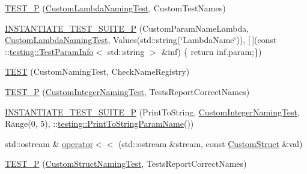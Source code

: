 \begin{DoxyCompactItemize}
\item 
\mbox{\hyperlink{_obj__test_2lib_2googletest-master_2googletest_2test_2googletest-param-test-test_8cc_af74d3252b2f4affab1dec164f84f8a20}{T\+E\+S\+T\+\_\+P}} (\mbox{\hyperlink{class_custom_lambda_naming_test}{Custom\+Lambda\+Naming\+Test}}, Custom\+Test\+Names)
\item 
\mbox{\hyperlink{_obj__test_2lib_2googletest-master_2googletest_2test_2googletest-param-test-test_8cc_a6ba446f001925b3f5081aece4f24401b}{I\+N\+S\+T\+A\+N\+T\+I\+A\+T\+E\+\_\+\+T\+E\+S\+T\+\_\+\+S\+U\+I\+T\+E\+\_\+P}} (Custom\+Param\+Name\+Lambda, \mbox{\hyperlink{class_custom_lambda_naming_test}{Custom\+Lambda\+Naming\+Test}}, Values(std\+::string(\char`\"{}Lambda\+Name\char`\"{})), \mbox{[}$\,$\mbox{]}(const \+::\mbox{\hyperlink{structtesting_1_1_test_param_info}{testing\+::\+Test\+Param\+Info}}$<$ std\+::string $>$ \&inf) \{ return inf.\+param;\})
\item 
\mbox{\hyperlink{_obj__test_2lib_2googletest-master_2googletest_2test_2googletest-param-test-test_8cc_a19d5fdc7df4c845bc0f2e7c50368e2a6}{T\+E\+ST}} (Custom\+Naming\+Test, Check\+Name\+Registry)
\item 
\mbox{\hyperlink{_obj__test_2lib_2googletest-master_2googletest_2test_2googletest-param-test-test_8cc_a0c9938b5941817c8181cab2de13ae24d}{T\+E\+S\+T\+\_\+P}} (\mbox{\hyperlink{class_custom_integer_naming_test}{Custom\+Integer\+Naming\+Test}}, Tests\+Report\+Correct\+Names)
\item 
\mbox{\hyperlink{_obj__test_2lib_2googletest-master_2googletest_2test_2googletest-param-test-test_8cc_ae11f3d793678cba59d7f2b5e8508da06}{I\+N\+S\+T\+A\+N\+T\+I\+A\+T\+E\+\_\+\+T\+E\+S\+T\+\_\+\+S\+U\+I\+T\+E\+\_\+P}} (Print\+To\+String, \mbox{\hyperlink{class_custom_integer_naming_test}{Custom\+Integer\+Naming\+Test}}, Range(0, 5), \+::\mbox{\hyperlink{structtesting_1_1_print_to_string_param_name}{testing\+::\+Print\+To\+String\+Param\+Name}}())
\item 
std\+::ostream \& \mbox{\hyperlink{_obj__test_2lib_2googletest-master_2googletest_2test_2googletest-param-test-test_8cc_a9751bdd724ed1a62f98208cf310bc1d9}{operator$<$$<$}} (std\+::ostream \&stream, const \mbox{\hyperlink{struct_custom_struct}{Custom\+Struct}} \&val)
\item 
\mbox{\hyperlink{_obj__test_2lib_2googletest-master_2googletest_2test_2googletest-param-test-test_8cc_a20d9b65a9ff30edb2daf274bc13ba3d7}{T\+E\+S\+T\+\_\+P}} (\mbox{\hyperlink{class_custom_struct_naming_test}{Custom\+Struct\+Naming\+Test}}, Tests\+Report\+Correct\+Names)

\end{DoxyCompactItemize}
